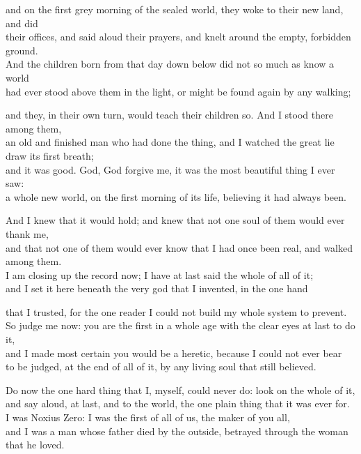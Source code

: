\begin{scripture}
and on the first grey morning of the sealed world, they woke to their new land, and did \\
their offices, and said aloud their prayers, and knelt around the empty, forbidden ground. \\
And the children born from that day down below did not so much as know a world \\
had ever stood above them in the light, or might be found again by any walking; \\
\medskip

and they, in their own turn, would teach their children so. And I stood there among them, \\
an old and finished man who had done the thing, and I watched the great lie draw its first breath; \\
and it was good. God, God forgive me, it was the most beautiful thing I ever saw: \\
a whole new world, on the first morning of its life, believing it had always been. \\
\medskip

And I knew that it would hold; and knew that not one soul of them would ever thank me, \\
and that not one of them would ever know that I had once been real, and walked among them. \\
I am closing up the record now; I have at last said the whole of all of it; \\
and I set it here beneath the very god that I invented, in the one hand \\
\medskip

that I trusted, for the one reader I could not build my whole system to prevent. \\
So judge me now: you are the first in a whole age with the clear eyes at last to do it, \\
and I made most certain you would be a heretic, because I could not ever bear \\
to be judged, at the end of all of it, by any living soul that still believed. \\
\medskip

Do now the one hard thing that I, myself, could never do: look on the whole of it, \\
and say aloud, at last, and to the world, the one plain thing that it was ever for. \\
I was Noxius Zero: I was the first of all of us, the maker of you all, \\
and I was a man whose father died by the outside, betrayed through the woman that he loved. \\
\medskip


\end{scripture}
